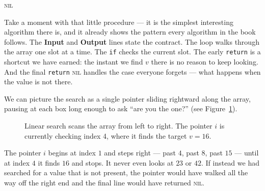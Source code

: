 \begin{algorithm}[H]
\caption{A first taste of pseudocode: linear search}
\label{ch00:linear-search}
\Return \textsc{nil} 
\end{algorithm}

Take a moment with that little procedure --- it is the simplest interesting
algorithm there is, and it already shows the pattern every algorithm in the book
follows. The
\textbf{Input} and \textbf{Output} lines state the contract. The loop walks
through the array one slot at a time. The \texttt{if} checks the current slot. The
early \texttt{return} is a shortcut we have earned: the instant we find $v$ there is no
reason to keep looking. And the final \texttt{return} \textsc{nil} handles the case
everyone forgets --- what happens when the value is not there.

We can picture the search as a single pointer sliding rightward along the array,
pausing at each box long enough to ask ``are you the one?'' (see Figure~\ref{fig:ch00-linear-search}).

\begin{figure}[htbp]
\centering
{}
\caption{Linear search scans the array from left to right. The pointer $i$ is currently checking index 4, where it finds the target $v=16$.}
\label{fig:ch00-linear-search}
\end{figure}

The pointer $i$ begins at index $1$ and steps right --- past $4$, past $8$, past
$15$ --- until at index $4$ it finds $16$ and stops. It never even looks at $23$
or $42$. If instead we had searched for a value that is not present, the pointer
would have walked all the way off the right end and the final line would have
returned \textsc{nil}.

